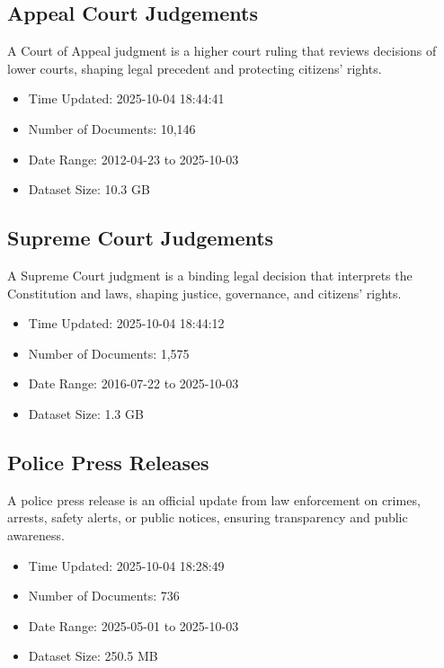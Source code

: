 \documentclass{article}%
\begin{document}
%
\subsection{Appeal Court Judgements}%
\label{subsec:AppealCourtJudgements}%
A Court of Appeal judgment is a higher court ruling that reviews decisions of lower courts, shaping legal precedent and protecting citizens’ rights.%
\begin{itemize}%
\item%
Time Updated: 2025{-}10{-}04 18:44:41%
\item%
Number of Documents: 10,146%
\item%
Date Range: 2012{-}04{-}23 to 2025{-}10{-}03%
\item%
Dataset Size: 10.3 GB%
\end{itemize}

%
\subsection{Supreme Court Judgements}%
\label{subsec:SupremeCourtJudgements}%
A Supreme Court judgment is a binding legal decision that interprets the Constitution and laws, shaping justice, governance, and citizens’ rights.%
\begin{itemize}%
\item%
Time Updated: 2025{-}10{-}04 18:44:12%
\item%
Number of Documents: 1,575%
\item%
Date Range: 2016{-}07{-}22 to 2025{-}10{-}03%
\item%
Dataset Size: 1.3 GB%
\end{itemize}

%
\subsection{Police Press Releases}%
\label{subsec:PolicePressReleases}%
A police press release is an official update from law enforcement on crimes, arrests, safety alerts, or public notices, ensuring transparency and public awareness.%
\begin{itemize}%
\item%
Time Updated: 2025{-}10{-}04 18:28:49%
\item%
Number of Documents: 736%
\item%
Date Range: 2025{-}05{-}01 to 2025{-}10{-}03%
\item%
Dataset Size: 250.5 MB%
\end{itemize}
\end{document}
